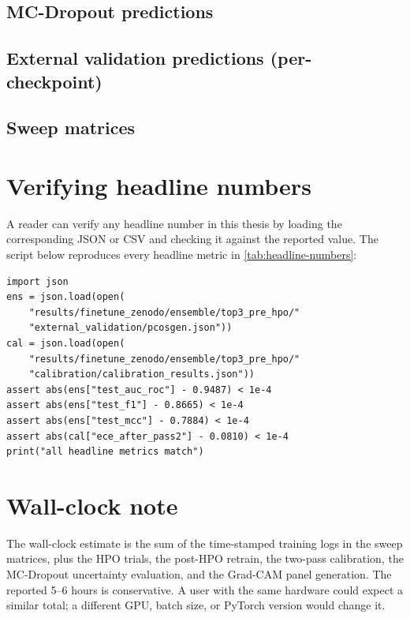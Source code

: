 \documentclass[../preamble.tex]{subfiles}
\begin{document}
\subsection*{MC-Dropout predictions}

\subsection*{External validation predictions (per-checkpoint)}

\subsection*{Sweep matrices}

\section{Verifying headline numbers}
\label{app:repro-verify}

A reader can verify any headline number in this thesis by loading the
corresponding JSON or CSV and checking it against the reported value. The
script below reproduces every headline metric in
\cref{tab:headline-numbers}:

\begin{verbatim}
import json
ens = json.load(open(
    "results/finetune_zenodo/ensemble/top3_pre_hpo/"
    "external_validation/pcosgen.json"))
cal = json.load(open(
    "results/finetune_zenodo/ensemble/top3_pre_hpo/"
    "calibration/calibration_results.json"))
assert abs(ens["test_auc_roc"] - 0.9487) < 1e-4
assert abs(ens["test_f1"] - 0.8665) < 1e-4
assert abs(ens["test_mcc"] - 0.7884) < 1e-4
assert abs(cal["ece_after_pass2"] - 0.0810) < 1e-4
print("all headline metrics match")
\end{verbatim}

\section{Wall-clock note}
\label{app:repro-wallclock}

The wall-clock estimate is the sum of the time-stamped training logs in the
sweep matrices, plus the HPO trials, the post-HPO retrain, the two-pass
calibration, the MC-Dropout uncertainty evaluation, and the Grad-CAM panel
generation. The reported 5--6 hours is conservative. A user with the same
hardware could expect a similar total; a different GPU, batch size, or
PyTorch version would change it.
\end{document}
